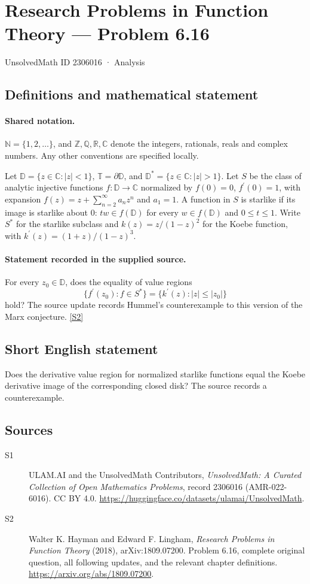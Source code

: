 \documentclass[11pt]{book}
\newcommand{\sref}[2]{\hyperlink{source:#1:#2}{[S#2]}}
\begin{document}
\setcounter{section}{2306015}
\section{Research Problems in Function Theory — Problem 6.16}\label{2306016}
{\small\sffamily UnsolvedMath ID 2306016 · Analysis}
\subsection{Definitions and mathematical statement}

\paragraph{Shared notation.}$\mathbb N=\{1,2,\ldots\}$, and $\mathbb Z,\mathbb Q,\mathbb R,\mathbb C$ denote the integers, rationals, reals and complex numbers. Any other conventions are specified locally.


Let $\mathbb D=\{z\in\mathbb C:|z|<1\}$, $\mathbb T=\partial\mathbb D$, and $\mathbb D^*=\{z\in\mathbb C:|z|>1\}$. Let $S$ be the class of analytic injective functions $f:\mathbb D\to\mathbb C$ normalized by $f(0)=0$, $f^{\prime}(0)=1$, with expansion $f(z)=z+\sum_{n=2}^{\infty}a_nz^n$ and $a_1=1$. A function in $S$ is starlike if its image is starlike about $0$: $tw\in f(\mathbb D)$ for every $w\in f(\mathbb D)$ and $0\le t\le1$. Write $S^*$ for the starlike subclass and $k(z)=z/(1-z)^2$ for the Koebe function, with $k^{\prime}(z)=(1+z)/(1-z)^3$.
\paragraph{Statement recorded in the supplied source.}
For every $z_0\in\mathbb D$, does the equality of value regions \[\{f^{\prime}(z_0):f\in S^*\}=\{k^{\prime}(z):|z|\le|z_0|\}\] hold? The source update records Hummel’s counterexample to this version of the Marx conjecture. \sref{2306016}{2}
\subsection{Short English statement}
Does the derivative value region for normalized starlike functions equal the Koebe derivative image of the corresponding closed disk? The source records a counterexample.
\subsection{Sources}
\begin{description}
\item[\hypertarget{source:2306016:1}{S1}] ULAM.AI and the UnsolvedMath Contributors, \emph{UnsolvedMath: A Curated Collection of Open Mathematics Problems}, record 2306016 (AMR-022-6016). CC BY 4.0. \url{https://huggingface.co/datasets/ulamai/UnsolvedMath}.
\item[\hypertarget{source:2306016:2}{S2}] Walter K. Hayman and Edward F. Lingham, \emph{Research Problems in Function Theory} (2018), arXiv:1809.07200. Problem 6.16, complete original question, all following updates, and the relevant chapter definitions. \url{https://arxiv.org/abs/1809.07200}.
\end{description}
\label{end:2306016}
\end{document}

